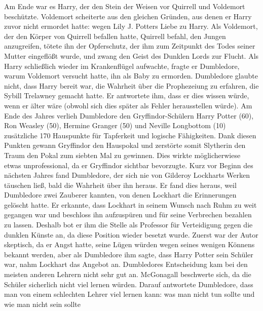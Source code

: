 \documentclass[a4paper, 10pt]{article}
\begin{document}
\vspace{10pt}
\newline
Am Ende war es Harry, der den Stein der Weisen vor Quirrell und Voldemort beschützte. Voldemort scheiterte aus den gleichen Gründen, aus denen er Harry zuvor nicht ermordet hatte: wegen Lily J. Potters Liebe zu Harry. Als Voldemort, der den Körper von Quirrell befallen hatte, Quirrell befahl, den Jungen anzugreifen, tötete ihn der Opferschutz, der ihm zum Zeitpunkt des Todes seiner Mutter eingeflößt wurde, und zwang den Geist des Dunklen Lords zur Flucht. Als Harry schließlich wieder im Krankenflügel aufwachte, fragte er Dumbledore, warum Voldemort versucht hatte, ihn als Baby zu ermorden. Dumbledore glaubte nicht, dass Harry bereit war, die Wahrheit über die Prophezeiung zu erfahren, die Sybill Trelawney gemacht hatte. Er antwortete ihm, dass er dies wissen würde, wenn er älter wäre (obwohl sich dies später als Fehler herausstellen würde).
\vspace{10pt}
\newline
Am Ende des Jahres verlieh Dumbledore den Gryffindor-Schülern Harry Potter (60), Ron Weasley (50), Hermine Granger (50) und Neville Longbottom (10) zusätzliche 170 Hauspunkte für Tapferkeit und logische Fähigkeiten. Dank diesen Punkten gewann Gryffindor den Hauspokal und zerstörte somit Slytherin den Traum den Pokal zum siebten Mal zu gewinnen. Dies wirkte möglicherwiese etwas unprofessional, da er Gryffindor sichtbar bevorzugte.
\vspace{10pt}
\newline
Kurz vor Beginn des nächsten Jahres fand Dumbledore, der sich nie von Gilderoy Lockharts Werken täuschen ließ, bald die Wahrheit über ihn heraus. Er fand dies heraus, weil Dumbledore zwei Zauberer kannten, von denen Lockhart die Erinnerungen gelöscht hatte. Er erkannte, dass Lockhart in seinem Wunsch nach Ruhm zu weit gegangen war und beschloss ihn aufzuspüren und für seine Verbrechen bezahlen zu lassen. Deshalb bot er ihm die Stelle als Professor für Verteidigung gegen die dunklen Künste an, da diese Position wieder besetzt wurde. Zuerst war der Autor skeptisch, da er Angst hatte, seine Lügen würden wegen seines wenigen Könnens bekannt werden, aber als Dumbledore ihm sagte, dass Harry Potter sein Schüler war, nahm Lockhart das Angebot an.
\vspace{10pt}
\newline
Dumbledores Entscheidung kam bei den meisten anderen Lehrern nicht sehr gut an. McGonagall beschwerte sich, da die Schüler sicherlich nicht viel lernen würden. Darauf antwortete Dumbledore, dass man von einem schlechten Lehrer viel lernen kann: was man nicht tun sollte und wie man nicht sein sollte
\end{document}
